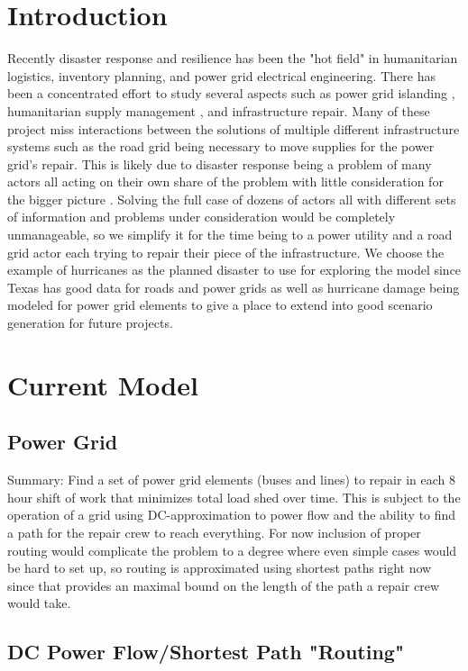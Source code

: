 \documentclass{article}
\begin{document}
	\section{Introduction}
	Recently disaster response and resilience has been the "hot field" in humanitarian logistics, inventory planning, and power grid electrical engineering. There has been a concentrated effort to study several aspects such as power grid islanding \cite{PanteliEA2016} \cite{DeepjyotiEA2018}, humanitarian supply management \cite{JiangEA2012} \cite{CaunhyeEA2012}, and infrastructure repair\cite{AksuEA2014}. Many of these project miss interactions between the solutions of multiple different infrastructure systems such as the road grid being necessary to move supplies for the power grid's repair. This is likely due to disaster response being a problem of many actors all acting on their own share of the problem with little consideration for the bigger picture\cite{VerasEA2012} . Solving the full case of dozens of actors all with different sets of information and problems under consideration would be completely unmanageable, so we simplify it for the time being to a power utility and a road grid actor each trying to repair their piece of the infrastructure. We choose the example of hurricanes as the planned disaster to use for exploring the model since Texas has good data for roads and power grids as well as hurricane damage being modeled for power grid elements \cite{GuikemaEA2010} to give a place to extend into good scenario generation for future projects.
	
	\section{Current Model}
	\subsection{Power Grid}
	Summary: Find a set of power grid elements (buses and lines) to repair in each 8 hour shift of work that minimizes total load shed over time. This is subject to the operation of a grid using DC-approximation to power flow and the ability to find a path for the repair crew to reach everything. For now inclusion of proper routing would complicate the problem to a degree where even simple cases would be hard to set up, so routing is approximated using shortest paths right now since that provides an maximal bound on the length of the path a repair crew would take. 
	
	\subsection{DC Power Flow/Shortest Path "Routing"}	
\end{document}
